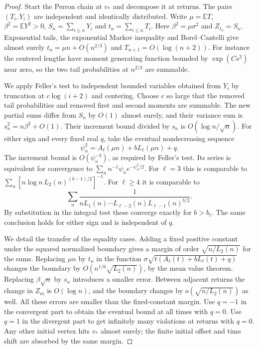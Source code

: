 \documentclass[11pt]{article}
\theoremstyle{definition}
\theoremstyle{remark}
\begin{document}
\begin{proof}
Start the Perron chain at $v_*$ and decompose it at returns.
The pairs $(T_i,Y_i)$ are independent and identically distributed.
Write $\mu=\mathbb ET$, $\beta^2=\mathbb EY^2>0$,
$S_n=\sum_{i\le n}Y_i$ and $t_n=\sum_{i\le n}T_i$.
Here $\beta^2=\mu\sigma^2$ and $Z_{t_n}=S_n$.
Exponential tails, the exponential Markov inequality and
Borel--Cantelli give almost surely
$t_n=\mu n+O(n^{2/3})$ and $T_{n+1}=O(\log(n+2))$.
For instance the centered lengths have moment generating
function bounded by $\exp(Cs^2)$ near zero, so the two
tail probabilities at $n^{2/3}$ are summable.

We apply Feller's test \cite[Theorem~2]{Feller1943} to independent
bounded variables obtained from $Y_i$ by truncation at
$c\log(i+2)$ and centering. Choose $c$ so large that the removed
tail probabilities and removed first and second moments are
summable. The new partial sums differ from $S_n$ by $O(1)$
almost surely, and their variance sum is
$s_n^2=n\beta^2+O(1)$. Their increment bound divided by $s_n$
is $O(\log n/\sqrt n)$. For either sign and every fixed real $q$,
take the eventual nondecreasing sequence
\[
 \psi_n^2=A_\ell(\mu n)+bL_\ell(\mu n)+q .
\]
The increment bound is $O(\psi_n^{-3})$, as required by
Feller's test. Its series is equivalent for convergence to
$\sum_n n^{-1}\psi_n e^{-\psi_n^2/2}$. For $\ell=3$ this is
comparable to
$\sum_n [n\log n\,L_2(n)^{(b-1)/2}]^{-1}$.
For $\ell\ge4$ it is comparable to
\[
 \sum_n \frac{1}{n L_1(n)\cdots L_{\ell-2}(n)
                                L_{\ell-1}(n)^{b/2}}.
\]
By substitution in the integral test these converge exactly
for $b>b_\ell$. The same conclusion holds for either sign and
is independent of $q$.

We detail the transfer of the equality cases. Adding a fixed
positive constant under the squared normalized boundary gives
a margin of order $\sqrt{n/L_2(n)}$ for the sums.
Replacing $\mu n$ by $t_n$ in the function
$\sigma\sqrt{t(A_\ell(t)+bL_\ell(t)+q)}$ changes the boundary by
$O(n^{1/6}\sqrt{L_2(n)})$, by the mean value theorem.
Replacing $\beta\sqrt n$ by $s_n$ introduces a smaller error.
Between adjacent returns the change in $Z_m$ is $O(\log n)$,
and the boundary changes by $o(\sqrt{n/L_2(n)})$ as well.
All these errors are smaller than the fixed-constant margin.
Use $q=-1$ in the convergent part to obtain the eventual bound
at all times with $q=0$. Use $q=1$ in the divergent part to get
infinitely many violations at returns with $q=0$.
Any other initial vertex hits $v_*$ almost surely; the finite
initial offset and time shift are absorbed by the same margin.


\end{proof}
\end{document}
